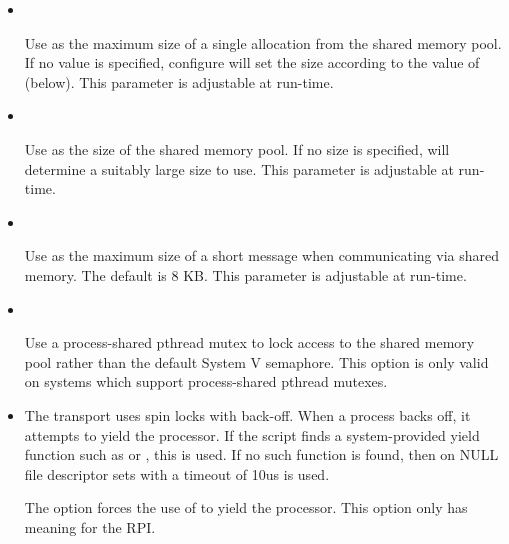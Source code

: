\begin{itemize}


\item {} \\
  
  Use  as the maximum size of a single allocation from the
  shared memory pool.  If no value is specified, configure will set
  the size according to the value of  (below).
  This parameter is adjustable at run-time.


\item {} \\
  
  Use  as the size of the shared memory pool.  If no size
  is specified,  will determine a suitably large size
  to use.  This parameter is adjustable at run-time.

\item {} \\
  
  Use  as the maximum size of a short message when
  communicating via shared memory.  The default is 8 KB.  This
  parameter is adjustable at run-time.


\item {} \\
  
  Use a process-shared pthread mutex to lock access to the shared
  memory pool rather than the default System V semaphore.  This option
  is only valid on systems which support process-shared pthread
  mutexes.


\item {}
  
  The  transport uses spin locks with back-off.  When a
  process backs off, it attempts to yield the processor.  If the
   script finds a system-provided yield function such
  as  or , this is used.  If no
  such function is found, then  on NULL file descriptor
  sets with a timeout of 10us is used.
  
  The  option forces the use of
   to yield the processor.  This option only has
  meaning for the  RPI.
\end{itemize}


